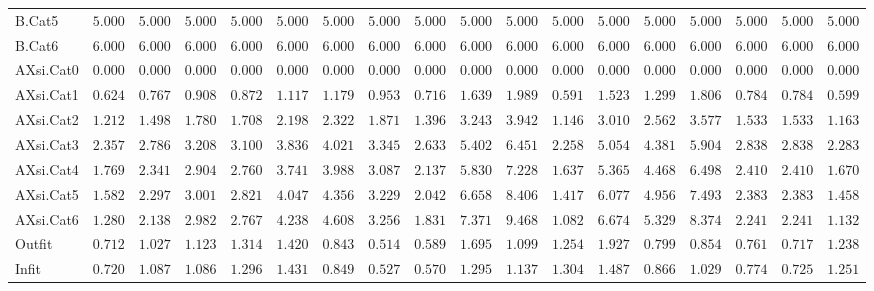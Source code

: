 \documentclass[6pt]{article}
\begin{document}
{\begin{longtable}{lrrrrrrrrrrrrrrrrr}
B.Cat5&$ 5.000$&$ 5.000$&$ 5.000$&$ 5.000$&$ 5.000$&$ 5.000$&$ 5.000$&$ 5.000$&$ 5.000$&$ 5.000$&$ 5.000$&$ 5.000$&$ 5.000$&$ 5.000$&$ 5.000$&$ 5.000$&$ 5.000$\tabularnewline
B.Cat6&$ 6.000$&$ 6.000$&$ 6.000$&$ 6.000$&$ 6.000$&$ 6.000$&$ 6.000$&$ 6.000$&$ 6.000$&$ 6.000$&$ 6.000$&$ 6.000$&$ 6.000$&$ 6.000$&$ 6.000$&$ 6.000$&$ 6.000$\tabularnewline
AXsi.Cat0&$ 0.000$&$ 0.000$&$ 0.000$&$ 0.000$&$ 0.000$&$ 0.000$&$ 0.000$&$ 0.000$&$ 0.000$&$ 0.000$&$ 0.000$&$ 0.000$&$ 0.000$&$ 0.000$&$ 0.000$&$ 0.000$&$ 0.000$\tabularnewline
AXsi.Cat1&$ 0.624$&$ 0.767$&$ 0.908$&$ 0.872$&$ 1.117$&$ 1.179$&$ 0.953$&$ 0.716$&$ 1.639$&$ 1.989$&$ 0.591$&$ 1.523$&$ 1.299$&$ 1.806$&$ 0.784$&$ 0.784$&$ 0.599$\tabularnewline
AXsi.Cat2&$ 1.212$&$ 1.498$&$ 1.780$&$ 1.708$&$ 2.198$&$ 2.322$&$ 1.871$&$ 1.396$&$ 3.243$&$ 3.942$&$ 1.146$&$ 3.010$&$ 2.562$&$ 3.577$&$ 1.533$&$ 1.533$&$ 1.163$\tabularnewline
AXsi.Cat3&$ 2.357$&$ 2.786$&$ 3.208$&$ 3.100$&$ 3.836$&$ 4.021$&$ 3.345$&$ 2.633$&$ 5.402$&$ 6.451$&$ 2.258$&$ 5.054$&$ 4.381$&$ 5.904$&$ 2.838$&$ 2.838$&$ 2.283$\tabularnewline
AXsi.Cat4&$ 1.769$&$ 2.341$&$ 2.904$&$ 2.760$&$ 3.741$&$ 3.988$&$ 3.087$&$ 2.137$&$ 5.830$&$ 7.228$&$ 1.637$&$ 5.365$&$ 4.468$&$ 6.498$&$ 2.410$&$ 2.410$&$ 1.670$\tabularnewline
AXsi.Cat5&$ 1.582$&$ 2.297$&$ 3.001$&$ 2.821$&$ 4.047$&$ 4.356$&$ 3.229$&$ 2.042$&$ 6.658$&$ 8.406$&$ 1.417$&$ 6.077$&$ 4.956$&$ 7.493$&$ 2.383$&$ 2.383$&$ 1.458$\tabularnewline
AXsi.Cat6&$ 1.280$&$ 2.138$&$ 2.982$&$ 2.767$&$ 4.238$&$ 4.608$&$ 3.256$&$ 1.831$&$ 7.371$&$ 9.468$&$ 1.082$&$ 6.674$&$ 5.329$&$ 8.374$&$ 2.241$&$ 2.241$&$ 1.132$\tabularnewline
Outfit&$ 0.712$&$ 1.027$&$ 1.123$&$ 1.314$&$ 1.420$&$ 0.843$&$ 0.514$&$ 0.589$&$ 1.695$&$ 1.099$&$ 1.254$&$ 1.927$&$ 0.799$&$ 0.854$&$ 0.761$&$ 0.717$&$ 1.238$\tabularnewline
Infit&$ 0.720$&$ 1.087$&$ 1.086$&$ 1.296$&$ 1.431$&$ 0.849$&$ 0.527$&$ 0.570$&$ 1.295$&$ 1.137$&$ 1.304$&$ 1.487$&$ 0.866$&$ 1.029$&$ 0.774$&$ 0.725$&$ 1.251$\tabularnewline
\hline
\end{longtable}}
\end{document}

